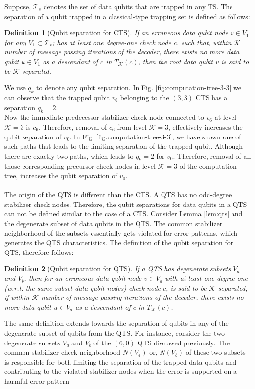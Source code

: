 \documentclass[%
 reprint,
 amsmath,amssymb,
 aps,
pra,
showkeys,
]{revtex4-2}
\newtheorem{definition}{Definition}[section]
\begin{document}
Suppose, $\mathcal{T}_s$ denotes the set of data qubits that are trapped in any TS.
The separation of a qubit trapped in a classical-type trapping set is defined as follows:
\begin{definition}[Qubit separation for CTS]
    \label{def:classical-separation}
    If an erroneous data qubit node $v \in V_1$ for any $V_1 \subset \mathcal{T}_s$; has at least one degree-one check node $c$, such that, within $\mathcal{K}$ number of message passing iterations of the decoder, there exists no more data qubit $u \in V_1$ as a descendant of $c$ in $T_{\mathcal{K}}(c)$, then the root data qubit $v$ is said to be $\mathcal{K}$ separated.
\end{definition}
We use $q_k$ to denote any qubit separation.
In Fig. \ref{fig:computation-tree-3-3} we can observe that the trapped qubit $v_0$ belonging to the $(3,3)$ CTS has a separation $q_k = 2$.
\\
Now the immediate predecessor stabilizer check node connected to $v_6$ at level $\mathcal{K}=3$ is $c_6$.
Therefore, removal of $c_6$ from level $\mathcal{K} = 3$, effectively increases the qubit separation of $v_0$.
In Fig. \ref{fig:computation-tree-3-3}, we have shown one of such paths that leads to the limiting separation of the trapped qubit.
Although there are exactly two paths, which leads to $q_k = 2$ for $v_0$.
Therefore, removal of all those corresponding precursor check nodes in level $\mathcal{K} = 3$ of the computation tree, increases the qubit separation of $v_0$.
\\\\
The origin of the QTS is different than the CTS.
A QTS has no odd-degree stabilizer check nodes.
Therefore, the qubit separations for data qubits in a QTS can not be defined similar to the case of a CTS.
Consider Lemma \ref{lem:qts} and the degenerate subset of data qubits in the QTS.
The common stabilizer neighborhood of the subsets essentially gets violated for error patterns, which generates the QTS characteristics.
The definition of the qubit separation for QTS, therefore  follows:
\begin{definition}[Qubit separation for QTS]
    \label{def:quantum-separation}
    If a QTS has degenerate subsets $V_a$ and $V_b$, then
    for an erroneous data qubit node $v \in V_a$ with at least one degree-one (w.r.t. the same subset data qubit nodes) check node $c$, is said to be $\mathcal{K}$ separated, if within $\mathcal{K}$ number of message passing iterations of the decoder, there exists no more data qubit $u \in V_a$ as a descendant of $c$ in $T_{\mathcal{K}}(c)$.
\end{definition}
The same definition extends towards the separation of qubits in any of the degenerate subset of qubits from the QTS.
For instance, consider the two degenerate subsets $V_a$ and $V_b$ of the $(6,0)$ QTS discussed previously.
The common stabilizer check neighborhood $N(V_a)$ or, $N(V_b)$ of these two subsets is responsible for both limiting the separation of the trapped data qubits and contributing to the violated stabilizer nodes when the error is supported on a harmful error pattern.
\end{document}
